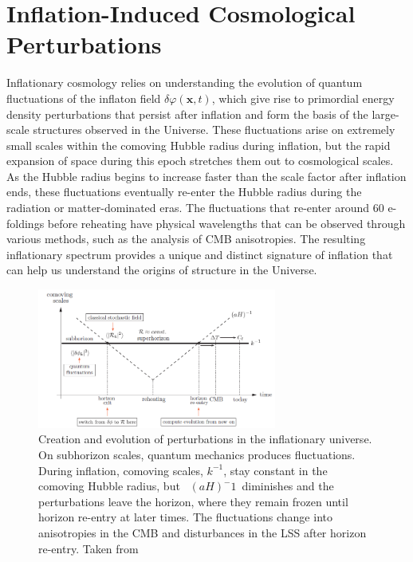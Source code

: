 \section{Inflation-Induced Cosmological Perturbations} \label{section 2.4}
 Inflationary cosmology relies on understanding the evolution of quantum fluctuations of the inflaton field $\delta \varphi(\mathbf{x},t)$, which give rise to primordial energy density perturbations that persist after inflation and form the basis of the large-scale structures observed in the Universe. These fluctuations arise on extremely small scales within the comoving Hubble radius during inflation, but the rapid expansion of space during this epoch stretches them out to cosmological scales. As the Hubble radius begins to increase faster than the scale factor after inflation ends, these fluctuations eventually re-enter the Hubble radius during the radiation or matter-dominated eras. The fluctuations that re-enter around 60 e-foldings before reheating have physical wavelengths that can be observed through various methods, such as the analysis of CMB anisotropies. The resulting inflationary spectrum provides a unique and distinct signature of inflation that can help us understand the origins of structure in the Universe. \\

 \begin{figure}[h]
    \centering
    \includegraphics[width=0.7\textwidth]{comving vs conformal time.png}
    \caption{Creation and evolution of perturbations in the inflationary universe. On subhorizon scales, quantum mechanics produces fluctuations. During inflation, comoving scales, $k^{-1}$, stay constant in the comoving Hubble radius, but  $(aH)^-{1}$ diminishes and the perturbations leave the horizon, where they remain frozen until horizon re-entry at later times. The fluctuations change into anisotropies in the CMB and disturbances in the LSS after horizon re-entry. Taken from \cite{baumann2012tasi}}
    \label{fig:2.3} 
\end{figure}

